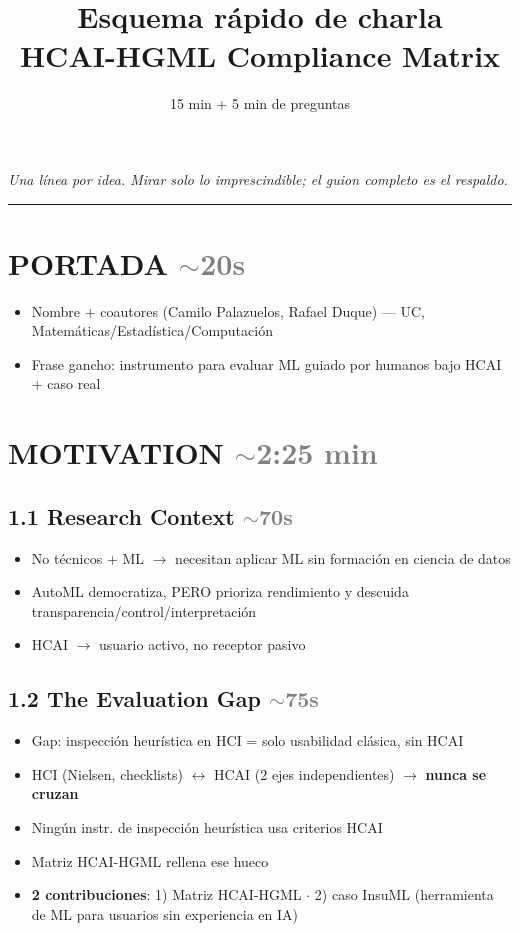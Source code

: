 \documentclass[10pt,a4paper]{article}
\title{\vspace{-1.5cm}\textbf{Esquema rápido de charla}\\[2pt]\large HCAI-HGML Compliance Matrix}
\author{}
\date{\small 15 min + 5 min de preguntas}
\newcommand{\tiempo}[1]{\hfill\normalfont\small\textcolor{gray}{$\sim$#1}}
\newcommand{\clave}[1]{\textbf{#1}}
\begin{document}
\maketitle
\vspace{-1cm}
\noindent\textit{\small Una línea por idea. Mirar solo lo imprescindible; el guion completo es el respaldo.}
\vspace{2mm}
\hrule
\vspace{2mm}

\section*{PORTADA \tiempo{20s}}
\begin{itemize}
    \item Nombre + coautores (Camilo Palazuelos, Rafael Duque) --- UC, Matemáticas/Estadística/Computación
    \item Frase gancho: instrumento para evaluar ML guiado por humanos bajo HCAI + caso real
\end{itemize}

\section{MOTIVATION \tiempo{2:25 min}}

\subsection*{1.1 Research Context \tiempo{70s}}
\begin{itemize}
    \item No técnicos + ML $\rightarrow$ necesitan aplicar ML sin formación en ciencia de datos
    \item AutoML democratiza, PERO prioriza rendimiento y descuida transparencia/control/interpretación
    \item HCAI $\rightarrow$ usuario activo, no receptor pasivo
\end{itemize}

\subsection*{1.2 The Evaluation Gap \tiempo{75s}}
\begin{itemize}
    \item Gap: inspección heurística en HCI = solo usabilidad clásica, sin HCAI
    \item HCI (Nielsen, checklists) $\longleftrightarrow$ HCAI (2 ejes independientes) $\rightarrow$ \textbf{nunca se cruzan}
    \item Ningún instr. de inspección heurística usa criterios HCAI
    \item Matriz HCAI-HGML rellena ese hueco
    \item \clave{2 contribuciones}: 1) Matriz HCAI-HGML $\cdot$ 2) caso InsuML (herramienta de ML para usuarios sin experiencia en IA)
\end{itemize}
\end{document}
